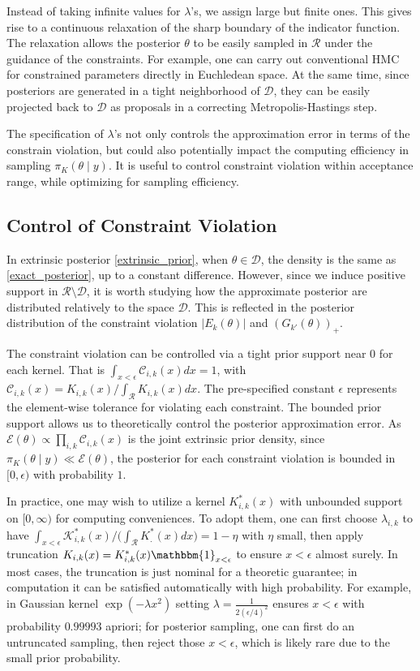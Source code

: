 \documentclass[10pt]{article}
\newcommand{\mc}[1]{\mathcal{#1}}
\begin{document}
Instead of taking infinite values for $\lambda$'s, we assign large but finite ones. This gives rise to a continuous relaxation of the sharp boundary of the indicator function. The relaxation allows the posterior $\theta$ to be easily sampled in $\mc R$ under the guidance of the constraints. For example, one can carry out conventional HMC for constrained parameters directly in Euchledean space. At the same time, since posteriors are generated in a tight neighborhood of $\mc D$, they can be easily projected back to $\mc D$ as proposals in a correcting Metropolis-Hastings step.

The specification of $\lambda$'s not only controls the approximation error in terms of the constrain violation, but could also potentially impact the computing efficiency in sampling $\pi_{K}(\theta \mid y)$. It is useful to control constraint violation within acceptance range, while optimizing for sampling efficiency.

\subsection{Control of Constraint Violation}

In extrinsic posterior \eqref{extrinsic_prior}, when $\theta \in \mc D$, the density is the same as \eqref{exact_posterior}, up to a constant difference. However, since we induce positive support in $\mc R \setminus \mc D$, it is worth studying how the approximate posterior are distributed relatively to the space $\mc D$. This is reflected in the posterior distribution of the constraint violation $|E_k(\theta)|$ and $(G_{k'}(\theta))_+$.

The constraint violation can be controlled via a tight prior support near $0$ for each kernel.  That is $\int_{x<\epsilon} \mc C_{i,k}(x)  dx= 1$, with  $\mc C_{i,k}(x) = K_{i,k}(x) / \int_{\mc R}K_{i,k}(x) dx$. The pre-specified constant $\epsilon$ represents the element-wise tolerance for violating each constraint. The bounded prior support allows us to theoretically control the posterior approximation error. As $\mc E(\theta) \propto \prod_{i,k} \mc C_{i,k}(x)$ is the joint extrinsic prior density, since $\pi_K(\theta \mid y) \ll \mc E(\theta)$, the posterior for each constraint violation is bounded in $[0,\epsilon)$ with probability $1$.

In practice, one may wish to utilize a kernel $K^*_{i,k}(x)$ with unbounded support on $[0,\infty)$ for computing conveniences. To adopt them, one can first choose $\lambda_{i,k}$ to have $\int_{x<\epsilon} \mc K^*_{i,k}(x)/ \big( \int_{\mc R} K^*_{.}(x) dx\big ) = 1-\eta$ with $\eta$ small, then apply truncation $K_{i,k}(x)= K^*_{i,k}(x) \mathbbm{1}_{x<\epsilon}$ to ensure $x<\epsilon$ almost surely. In most cases, the truncation is just nominal for a theoretic guarantee; in computation it can be satisfied automatically with high probability. For example, in Gaussian kernel $\exp( -{\lambda x^2})$ setting $\lambda = \frac{1}{ 2(\epsilon/4)^2}$ ensures $x<\epsilon$ with probability $0.99993$ apriori; for posterior sampling, one can first do an untruncated sampling, then reject those $x<\epsilon$, which is likely rare due to the small prior probability. 
\end{document}
